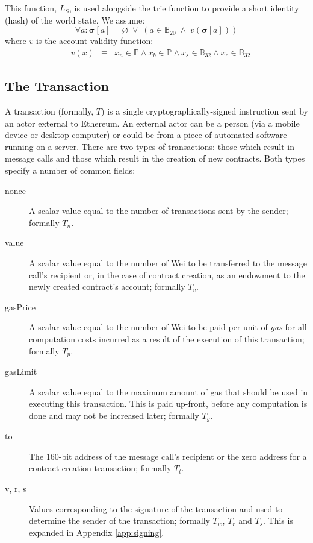 \documentclass[9pt,oneside]{amsart}
\begin{document}
\begin{multicols}{2}
This function, $L_S$, is used alongside the trie function to provide a short identity (hash) of the world state. We assume:
\begin{equation}
\forall a: \boldsymbol{\sigma}[a] = \varnothing \; \vee \; (a \in \mathbb{B}_{20} \; \wedge \; v(\boldsymbol{\sigma}[a]))
\end{equation}
where $v$ is the account validity function:
\begin{eqnarray}
\quad v(x) & \equiv & x_n \in \mathbb{P} \wedge x_b \in \mathbb{P} \wedge x_s \in \mathbb{B}_{32} \wedge x_c \in \mathbb{B}_{32}
\end{eqnarray}

\subsection{The Transaction} \label{ch:transaction}

A transaction (formally, $T$) is a single cryptographically-signed instruction sent by an actor external to Ethereum. An external actor can be a person (via a mobile device or desktop computer) or could be from a piece of automated software running on a server. There are two types of transactions: those which result in message calls and those which result in the creation of new contracts. Both types specify a number of common fields:

\begin{description}
\item[nonce] A scalar value equal to the number of transactions sent by the sender; formally $T_n$.
\item[value] A scalar value equal to the number of Wei to be transferred to the message call's recipient or, in the case of contract creation, as an endowment to the newly created contract's account; formally $T_v$.
\item[gasPrice] A scalar value equal to the number of Wei to be paid per unit of \textit{gas} for all computation costs incurred as a result of the execution of this transaction; formally $T_p$.
\item[gasLimit] A scalar value equal to the maximum amount of gas that should be used in executing this transaction. This is paid up-front, before any computation is done and may not be increased later; formally $T_g$.
\item[to] The 160-bit address of the message call's recipient or the zero address for a contract-creation transaction; formally $T_t$.
\item[v, r, s] Values corresponding to the signature of the transaction and used to determine the sender of the transaction; formally $T_w$, $T_r$ and $T_s$. This is expanded in Appendix \ref{app:signing}.
\end{description}


\end{multicols}
\end{document}
